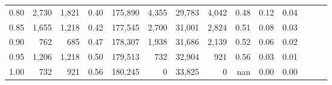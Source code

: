 \begin{tabular}{rrrrrrrrrrrrrr}
0.80 &   2,730 &  1,821 &  0.40 &  175,890 &    4,355 &  29,783 &   4,042 &  0.48 &  0.12 &      0.04 \\
0.85 &   1,655 &  1,218 &  0.42 &  177,545 &    2,700 &  31,001 &   2,824 &  0.51 &  0.08 &      0.03 \\
0.90 &     762 &    685 &  0.47 &  178,307 &    1,938 &  31,686 &   2,139 &  0.52 &  0.06 &      0.02 \\
0.95 &   1,206 &  1,218 &  0.50 &  179,513 &      732 &  32,904 &     921 &  0.56 &  0.03 &      0.01 \\
1.00 &     732 &    921 &  0.56 &  180,245 &        0 &  33,825 &       0 &   nan &  0.00 &      0.00 \\
\bottomrule
\end{tabular}

